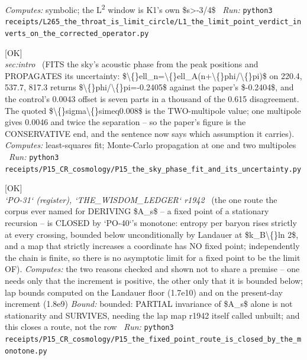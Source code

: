 \begin{description}
\emph{Computes:} symbolic; the L\textsuperscript{2} window is K1's own \$s>-3/4\$
\ \emph{Run:} \texttt{python3 receipts/L265\_the\_throat\_is\_limit\_circle/L1\_the\_limit\_point\_verdict\_inverts\_on\_the\_corrected\_operator.py}
\item[\label{rcpt:P15_the_sky_phase_fit_and_its_uncertainty}\texttt{P15\_the\_sky\_phase\_fit\_and\_its\_uncertainty}]\hfill\textsf{[OK]}\\
\textit{sec:intro} \ (FITS the sky's acoustic phase from the peak positions and PROPAGATES its uncertainty: \$\textbackslash\{\}ell\_n=\textbackslash\{\}ell\_A(n+\textbackslash\{\}phi/\textbackslash\{\}pi)\$ on 220.4, 537.7, 817.3 returns \$\textbackslash\{\}phi/\textbackslash\{\}pi=-0.2405\$ against the paper's \$-0.2404\$, and the control's 0.0043 offset is seven parts in a thousand of the 0.615 disagreement.  The quoted \$\textbackslash\{\}sigma\textbackslash\{\}simeq0.008\$ is the TWO-multipole value; one multipole gives 0.0046 and twice the separation -- so the paper's figure is the CONSERVATIVE end, and the sentence now says which assumption it carries). 
\emph{Computes:} least-squares fit; Monte-Carlo propagation at one and two multipoles
\ \emph{Run:} \texttt{python3 receipts/P15\_CR\_cosmology/P15\_the\_sky\_phase\_fit\_and\_its\_uncertainty.py}
\item[\label{rcpt:P15_the_fixed_point_route_is_closed_by_the_monotone}\texttt{P15\_the\_fixed\_point\_route\_is\_closed\_by\_the\_monotone}]\hfill\textsf{[OK]}\\
\textit{`PO-31` (register), `THE\_WISDOM\_LEDGER` r1942} \ (the one route the corpus ever named for DERIVING \$A\_s\$ -- a fixed point of a stationary recursion -- is CLOSED by `PO-40`'s monotone: entropy per baryon rises strictly at every crossing, bounded below unconditionally by Landauer at \$k\_B\textbackslash\{\}ln 2\$, and a map that strictly increases a coordinate has NO fixed point; independently the chain is finite, so there is no asymptotic limit for a fixed point to be the limit OF). 
\emph{Computes:} the two reasons checked and shown not to share a premise -- one needs only that the increment is positive, the other only that it is bounded below; lap bounds computed on the Landauer floor (1.7e10) and on the present-day increment (1.8e9)
 \emph{Bound:} bounded: PARTIAL invariance of \$A\_s\$ alone is not stationarity and SURVIVES, needing the lap map r1942 itself called unbuilt; and this closes a route, not the row
\ \emph{Run:} \texttt{python3 receipts/P15\_CR\_cosmology/P15\_the\_fixed\_point\_route\_is\_closed\_by\_the\_monotone.py}

\end{description}
